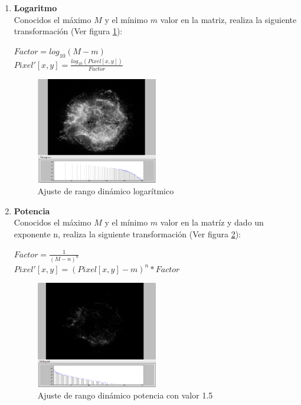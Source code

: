 \begin{enumerate}
\begin{figure}[!htb]
			\end{figure}
		\item \textbf{{}Logaritmo}\\
		Conocidos el máximo $M$ y el mínimo $m$ valor en la matriz, realiza
		la siguiente transformación (Ver figura \ref{fig:HDRLOG}):
			\begin{center}
				{\large $Factor=log_{10}(M-m)$\\
				$Pixel'[x,y]=\frac{log_{10}(Pixel[x,y])}{Factor}$
				}
			\end{center}	
			\begin{figure}[!htb]
				\centering
				\includegraphics[width=0.5\textwidth]{images/HDREQ/chandraLog.PNG}
				\caption{\label{fig:HDRLOG}{\small Ajuste de rango dinámico logarítmico}}
			\end{figure}

		\item \textbf{Potencia}\\
		Conocidos el máximo $M$ y el mínimo $m$ valor en la matríz y dado
		un exponente n, realiza la siguiente transformación (Ver figura \ref{fig:HDRPOW}):
		\\
		\begin{center}
			{\large $Factor=\frac{1}{(M-n)^{n}}$}
			\\
			{\large $Pixel'[x,y]=(Pixel[x,y]-m)^{n}*Factor$}
		\end{center}
			\begin{figure}[!htb]
				\centering
				\includegraphics[width=0.5\textwidth]{images/HDREQ/chandraPow1_5.PNG}
				\caption{\label{fig:HDRPOW}{\small Ajuste de rango dinámico potencia con valor 1.5}}
			\end{figure}



\end{enumerate}
